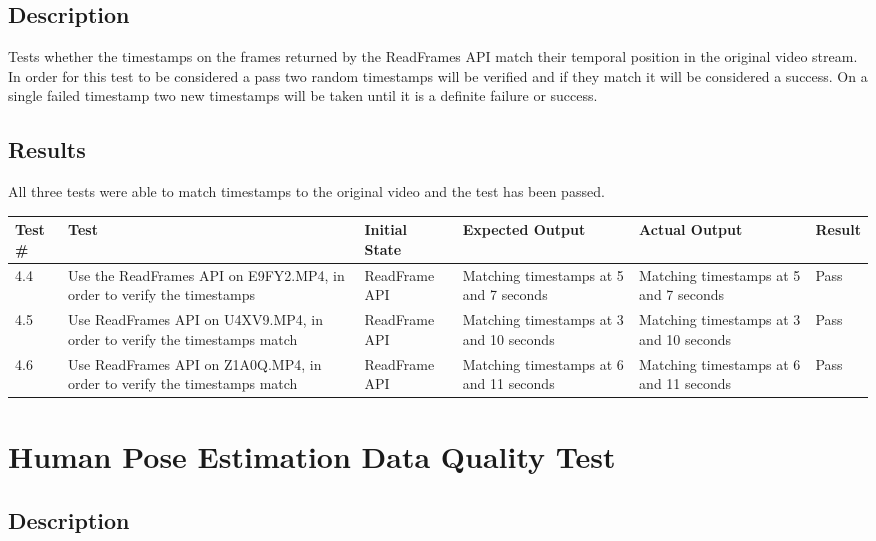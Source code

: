 \documentclass{scrreprt}
\begin{document}
\subsection{Description}

Tests whether the timestamps on the frames returned by the ReadFrames API match their temporal position in the original video stream. In order for this test to be considered a pass two random timestamps will be verified and if they match it will be considered a success. On a single failed timestamp two new timestamps will be taken until it is a definite failure or success.

\subsection{Results}

All three tests were able to match timestamps to the original video and the test has been passed.

\begin{table}[H]
        \centering
        \begin{tabular}[t]{||p{0.75cm}|p{4cm}|p{2.5cm}|p{3cm}|p{2.5cm}|p{1cm}||}
                \hline
                \textbf Test \# & \textbf Test & \textbf Initial State & \textbf Expected Output & \textbf Actual Output & \textbf Result\\
                \hline\hline
                4.4 & Use the ReadFrames API on E9FY2.MP4, in order to verify the timestamps & ReadFrame API & Matching timestamps at 5 and 7 seconds & Matching timestamps at 5 and 7 seconds & Pass\\
                \hline
                4.5 & Use ReadFrames API on U4XV9.MP4, in order to verify the timestamps match & ReadFrame API & Matching timestamps at 3 and 10 seconds & Matching timestamps at 3 and 10 seconds & Pass\\
                \hline
                4.6 & Use ReadFrames API on Z1A0Q.MP4, in order to verify the timestamps match & ReadFrame API & Matching timestamps at 6 and 11 seconds & Matching timestamps at 6 and 11 seconds  & Pass\\
                \hline
        \end{tabular}
\end{table}

\section{Human Pose Estimation Data Quality Test}
\subsection{Description}
\end{document}

